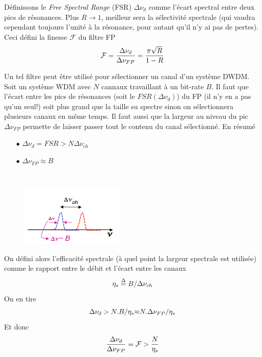 Définissons le \textit{Free Spectral Range} (FSR) $\Delta\nu_d$ comme l'écart spectral entre deux
pics de résonances. Plus $R\to1$, meilleur sera la sélectivité spectrale (qui vaudra cependant
toujours l'unité à la résonance, pour autant qu'il n'y ai pas de pertes). Ceci défini la
finesse $\mathcal{F}$ du filtre FP
\begin{equation}
{\cal F} = \frac{{\Delta {\nu _d}}}{{\Delta {\nu _{FP}}}} = \frac{{\pi \sqrt R }}{{1 - R}}
\end{equation}

\newpage
Un tel filtre peut être utilisé pour sélectionner un canal d'un système DWDM. Soit un système
WDM avec $N$ cannaux travaillant à un bit-rate $B$. Il faut que l'écart entre les pics de résonances
(soit le $FSR(\Delta\nu_d)$) du FP (il n'y en a pas qu'un seul!) soit plus grand que la taille
su spectre sinon on sélectionnera plusieurs canaux en même temps. Il faut aussi que la largeur
au niveau du pic $\Delta\nu_{FP}$ permette de laisser passer tout le contenu du canal sélectionné.
En résumé\\

\begin{itemize}
\item[$\bullet$] $\Delta\nu_d = FSR > N\Delta\nu_{ch}$
\item[$\bullet$] $\Delta \nu_{FP} \approx B$
\end{itemize}\ 

	\begin{figure}
	\vspace{-5mm}
	\includegraphics[scale=0.93]{ch3/image19}
	\end{figure}
On défini alors l'efficacité spectrale  (à quel point la largeur spectrale est utilisée) comme le
rapport entre le débit et l'écart entre les canaux
\begin{equation}
{\eta _s} \buildrel \Delta \over = {B \mathord{\left/
 {\vphantom {B {\Delta {\nu _{ch}}}}} \right.
 \kern-\nulldelimiterspace} {\Delta {\nu _{ch}}}}
\end{equation}
On en tire
\begin{equation}
\Delta {\nu _d} > N.B/{\eta _s}{\rm{\approx }}N.\Delta {\nu _{FP}}/{\eta _s}
\end{equation}
Et donc
\begin{equation}
\frac{{\Delta {\nu _d}}}{{\Delta {\nu _{FP}}}} = {\cal F} > \frac{N}{{{\eta _s}}}
\end{equation}

